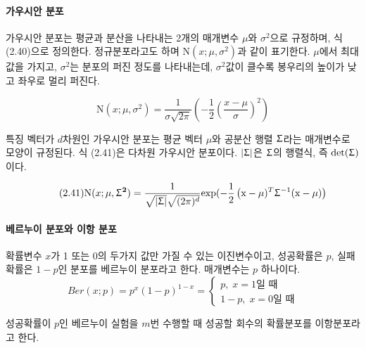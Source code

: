 \documentclass [12pt] {oblivoir}
\begin{document}
\paragraph*{가우시안 분포}\mbox{}

\vspace{3mm}
\;가우시안 분포는 평균과 분산을 나타내는 2개의 매개변수 $\mu$와 $\sigma^{2}$으로 규정하며,
식 (2.40)으로 정의한다. 정규분포라고도 하며 $\text{N}(x; \mu, \sigma^{2})$과 같이 표기한다. $\mu$에서 최대값을 가지고, $\sigma^{2}$는 분포의 퍼진 정도를 나타내는데,
$\sigma^{2}$값이 클수록 봉우리의 높이가 낮고 좌우로 멀리 퍼진다.

\begin{equation} \tag{2.40}
  \text{N}(x; \mu, \sigma^{2}) = \frac{1}{\sigma\sqrt{2\pi}}\left(-\frac{1}{2}\left(\frac{x - \mu}{\sigma}\right)^{2}\right)
\end{equation}

\vspace{3mm}
\;특징 벡터가 $d$차원인 가우시안 분포는 평균 벡터 $\mu$와 공분산 행렬 $\mathbf{\Upsigma}$라는 매개변수로 모양이 규정된다. 식 (2.41)은 다차원 가우시안 분포이다.
$|\mathbf{\Upsigma}|$은 $\mathbf{\Upsigma}$의 행렬식, 즉 $\text{det}(\mathbf{\Upsigma})$이다.

\begin{equation} \tag{2.41}
  \text{N}(x; \mu, \mathbf{\Upsigma^{2}}) = \frac{1}{\sqrt{|\mathbf{\Upsigma}|}\sqrt{(2\pi)^{d}}}\text{exp}(-\frac{1}{2}\left(\mathbf{\text{x}} - \mathbf{\mu})^{T}\mathbf{\Upsigma}^{-1}(\mathbf{\text{x} - \mu})\right)
\end{equation}

\paragraph*{베르누이 분포와 이항 분포}\mbox{}

확률변수 $x$가 1 또는 0의 두가지 값만 가질 수 있는 이진변수이고, 성공확률은 $p$, 실패확률은 $1-p$인 분포를 베르누이 분포라고 한다. 매개변수는 $p$ 하나이다.
\begin{equation} \tag{2.42}
  Ber(x; p) = p^{x}(1 - p)^{1 - x} =
  \begin{cases}
    p,\;x = 1 \text{일 때} \\
    1 - p,\;x = 0 \text{일 때}
  \end{cases}
\end{equation}

성공확률이 $p$인 베르누이 실험을 $m$번 수행할 때 성공할 회수의 확률분포를 이항분포라고 한다.
\end{document}
